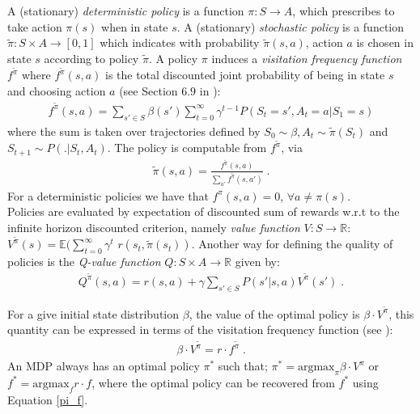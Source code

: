 \documentclass[sigconf]{aamas}  %
\begin{document}
A (stationary) \textit{deterministic policy} is a function $\pi: S \longrightarrow A$, which prescribes to take action $\pi(s)$ when in state $s$. A (stationary) \textit{stochastic policy} is a function $\tilde{\pi}: S \times A \longrightarrow [0,1]$ which indicates with probability $\tilde{\pi} (s,a)$, action $a$ is chosen in state $s$ according to policy $\tilde{\pi}$. A policy $\pi$ induces a \textit{visitation frequency function} $f^{\tilde{\pi}}$ where $f^{\tilde{\pi}}(s,a)$ is the total discounted joint probability of being in state $s$ and choosing action $a$ (see Section $6.9$ in \cite{Puterman1994}):
\begin{align*}
f^{\tilde{\pi}}(s, a) = \sum_{s' \in S} \beta(s') \sum_{t=0}^{\infty} \gamma^{t-1}P(S_t = s', A_t = a | S_1 = s)
\end{align*}
where the sum is taken over trajectories defined by $S_0 \sim \beta, A_t \sim \tilde{\pi}(S_t)$ and $S_{t+1} \sim P(.|S_t,A_t)$. The policy is computable from $f^{\tilde{\pi}}$, via 
\begin{align}\label{pi_f}
\tilde{\pi}(s,a) = \frac{f^{\tilde{\pi}}(s, a)}{\sum_{a'} f^{\tilde{\pi}} (s,a')}\;.
\end{align}
For a deterministic policies we have that $f^{\pi}(s,a)= 0$, $\forall a \neq \pi(s)$.\\
Policies are evaluated by expectation of discounted sum of rewards w.r.t to the infinite horizon discounted criterion, namely \textit{value function} $V: S \longrightarrow \mathbb{R}$: 
$V^{\tilde{\pi}}(s) = \mathbb{E}(\sum_{t=0}^{\infty} \gamma^{t}$ $r(s_t, \tilde{\pi}(s_t))$. %
Another way for defining the quality of policies is the \textit{Q-value function}   $Q: S \times A \longrightarrow \mathbb{R}$ given by:
\begin{align}\label{q-v}
Q^{\tilde{\pi}}(s, a) = r(s, a) + \gamma \sum_{s' \in S} P(s'|s,a)V^{\tilde{\pi}}(s')\;.
\end{align}

For a give initial state distribution $\beta$, the value of the optimal policy is $\beta \cdot V^{\tilde{\pi}}$, this quantity can be expressed in terms of the visitation frequency function (see \cite{Puterman1994}): 
\begin{align}\label{f-v}
\beta \cdot V^{\tilde{\pi}} = r \cdot f^{\tilde{\pi}}\;.
\end{align}
An MDP always has an optimal policy $\pi^*$ such that; $\pi^* = \text{argmax}_{\pi} \beta \cdot V^{\pi}$ or $f^{*} = \text{argmax}_{f} r \cdot f$, where the optimal policy can be recovered from $f^*$ using Equation \ref{pi_f}. 
\end{document}
